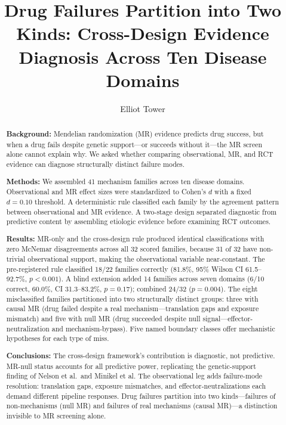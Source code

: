 \documentclass[11pt]{article}
\title{Drug Failures Partition into Two Kinds: Cross-Design Evidence Diagnosis Across Ten Disease Domains}
\author{Elliot Tower}
\affil{Independent researcher \\ \texttt{elliot@elliottower.ai}}
\date{}
\begin{document}
\maketitle

\begin{abstract}
\textbf{Background:}
Mendelian randomization (MR) evidence predicts drug success, but when a drug fails despite genetic support---or succeeds without it---the MR screen alone cannot explain why. We asked whether comparing observational, MR, and RCT evidence can diagnose structurally distinct failure modes.

\textbf{Methods:}
We assembled 41 mechanism families across ten disease domains. Observational and MR effect sizes were standardized to Cohen's $d$ with a fixed $d = 0.10$ threshold. A deterministic rule classified each family by the agreement pattern between observational and MR evidence. A two-stage design separated diagnostic from predictive content by assembling etiologic evidence before examining RCT outcomes.

\textbf{Results:}
MR-only and the cross-design rule produced identical classifications with zero McNemar disagreements across all 32 scored families, because 31 of 32 have non-trivial observational support, making the observational variable near-constant. The pre-registered rule classified 18/22 families correctly (81.8\%, 95\% Wilson CI 61.5--92.7\%, $p < 0.001$). A blind extension added 14 families across seven domains (6/10 correct, 60.0\%, CI 31.3--83.2\%, $p = 0.17$); combined 24/32 ($p = 0.004$). The eight misclassified families partitioned into two structurally distinct groups: three with causal MR (drug failed despite a real mechanism---translation gaps and exposure mismatch) and five with null MR (drug succeeded despite null signal---effector-neutralization and mechanism-bypass). Five named boundary classes offer mechanistic hypotheses for each type of miss.

\textbf{Conclusions:}
The cross-design framework's contribution is diagnostic, not predictive. MR-null status accounts for all predictive power, replicating the genetic-support finding of Nelson et al.\ and Minikel et al. The observational leg adds failure-mode resolution: translation gaps, exposure mismatches, and effector-neutralizations each demand different pipeline responses. Drug failures partition into two kinds---failures of non-mechanisms (null MR) and failures of real mechanisms (causal MR)---a distinction invisible to MR screening alone.
\end{abstract}
\end{document}
